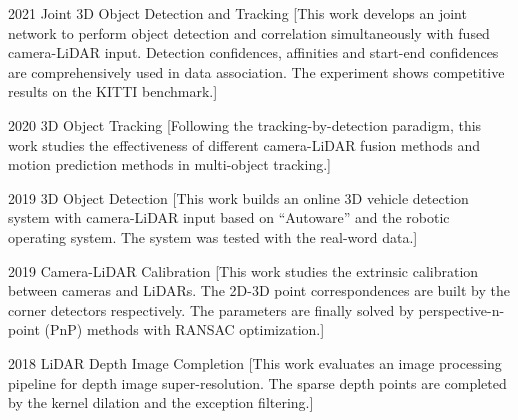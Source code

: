 \documentclass{resume}
\begin{document}
\begin{experiences}
  \experience%
	{2021}%
    {Joint 3D Object Detection and Tracking}%
    [This work develops an joint network to perform object detection and correlation simultaneously with fused camera-LiDAR input. Detection confidences, affinities and start-end confidences are comprehensively used in data association. The experiment shows competitive results on the KITTI benchmark.]  
  
\separator{0.5ex}

  \experience%
    {2020}%
    {3D Object Tracking}%
    [Following the tracking-by-detection paradigm, this work studies the effectiveness of different camera-LiDAR fusion methods and motion prediction methods in multi-object tracking.]

\separator{0.5ex}

  \experience%
    {2019}%
    {3D Object Detection}%
    [This work builds an online 3D vehicle detection system with camera-LiDAR input based on ``Autoware'' and the robotic operating system. The system was tested with the real-word data.] 

\separator{0.5ex}

  \experience%
    {2019}%
    {Camera-LiDAR Calibration}%
    [This work studies the extrinsic calibration between cameras and LiDARs. The 2D-3D point correspondences are built by the corner detectors respectively. The parameters are finally solved by perspective-n-point (PnP) methods with RANSAC optimization.]

\separator{0.5ex}

  \experience%
    {2018}%
    {LiDAR Depth Image Completion}%
    [This work evaluates an image processing pipeline for depth image super-resolution. The sparse depth points are completed by the kernel dilation and the exception filtering.]   
    

\end{experiences}

\begin{competences}[12em]
\end{competences}
\end{document}
